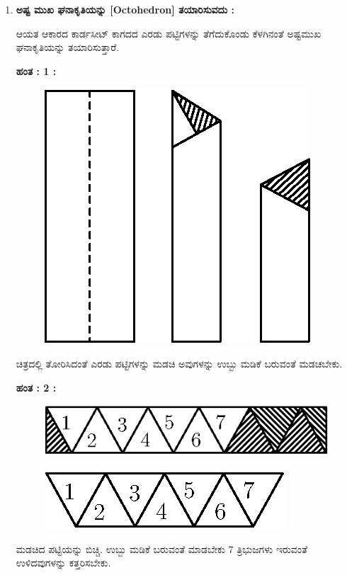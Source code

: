 \begin{enumerate}
\item \textbf{ಅಷ್ಟ ಮುಖ ಘನಾಕೃತಿಯನ್ನು [Octohedron] ತಯಾರಿಸುವದು :}

ಆಯತ ಆಕಾರದ ಕಾರ್ಡಸೀಟ್ ಕಾಗದದ ಎರಡು ಪಟ್ಟಿಗಳನ್ನು ತೆಗೆದುಕೊಂಡು ಕೆಳಗಿನಂತೆ ಅಷ್ಟಮುಖ ಘನಾಕೃತಿಯನ್ನು ತಯಾರಿಸುತ್ತಾರೆ. 

\eject


\noindent
\textbf{ಹಂತ : 1 :}
\begin{figure}[H]
\centering
\includegraphics[scale=.98]{src/figure/chap1/fig1-20a.eps}
\end{figure}

ಚಿತ್ರದಲ್ಲಿ ತೋರಿಸಿದಂತೆ ಎರಡು ಪಟ್ಟಿಗಳನ್ನು ಮಡಚಿ ಅವುಗಳನ್ನು ಉಬ್ಬು ಮಡಿಕೆ ಬರುವಂತೆ ಮಡಚಬೇಕು.

\noindent
\textbf{ಹಂತ : 2 :}
\begin{figure}[H]
\centering
\includegraphics[scale=.98]{src/figure/chap1/fig1-20b.eps}
\end{figure}
\begin{figure}[H]
\centering
\includegraphics[scale=.98]{src/figure/chap1/fig1-20c.eps}
\end{figure}

ಮಡಚಿದ ಪಟ್ಟಿಯನ್ನು ಬಿಚ್ಚಿ. ಉಬ್ಬು ಮಡಿಕೆ ಬರುವಂತೆ ಮಾಡಬೇಕು 7 ತ್ರಿಭುಜಗಳು ಇರುವಂತೆ ಉಳಿದವುಗಳನ್ನು ಕತ್ತರಿಸಬೇಕು. 


\end{enumerate}
